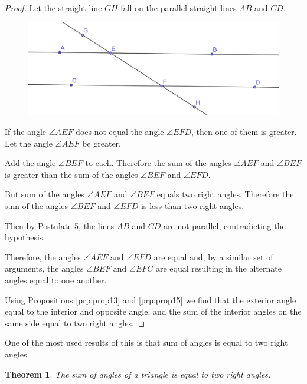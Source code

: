 \documentclass[
]{book}
\newtheorem{theorem}{Theorem}[chapter]
\theoremstyle{definition}
\theoremstyle{definition}
\theoremstyle{definition}
\theoremstyle{definition}
\theoremstyle{remark}
\begin{document}
\begin{proof}
Let the straight line \(GH\) fall on the parallel straight lines \(AB\) and \(CD\).

\begin{figure}

{\centering \includegraphics[width=0.75\linewidth]{images/Prop28} 

}

\end{figure}

If the angle \(\angle AEF\) does not equal the angle \(\angle EFD\), then one of them is greater. Let the angle \(\angle AEF\) be greater.

Add the angle \(\angle BEF\) to each. Therefore the sum of the angles \(\angle AEF\) and \(\angle BEF\) is greater than the sum of the angles \(\angle BEF\) and \(\angle EFD\).

But sum of the angles \(\angle AEF\) and \(\angle BEF\) equals two right angles. Therefore the sum of the angles \(\angle BEF\) and \(\angle EFD\) is less than two right angles.

Then by Postulate 5, the lines \(AB\) and \(CD\) are not parallel, contradicting the hypothesis.

Therefore, the angles \(\angle AEF\) and \(\angle EFD\) are equal and, by a similar set of arguments, the angles \(\angle BEF\) and \(\angle EFC\) are equal resulting in the alternate angles equal to one another.

Using Propositions \ref{prp:prop13} and \ref{prp:prop15} we find that the exterior angle equal to the interior and opposite angle, and the sum of the interior angles on the same side equal to two right angles.
\end{proof}

One of the most used results of this is that sum of angles is equal to two right angles.

\begin{theorem}
\protect\hypertarget{thm:angles-triangle}{}\label{thm:angles-triangle}The sum of angles of a triangle is equal to two right angles.
\end{theorem}
\end{document}
